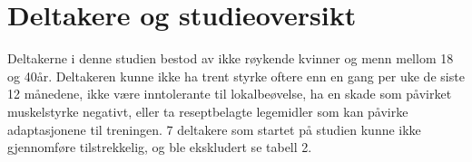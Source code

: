 \documentclass[
]{book}
\begin{document}
\hypertarget{deltakere-og-studieoversikt}{%
\section{Deltakere og studieoversikt}\label{deltakere-og-studieoversikt}}

Deltakerne i denne studien bestod av ikke røykende kvinner og menn mellom 18 og 40år. Deltakeren kunne ikke ha trent styrke oftere enn en gang per uke de siste 12 månedene, ikke være inntolerante til lokalbeøvelse, ha en skade som påvirket muskelstyrke negativt, eller ta reseptbelagte legemidler som kan påvirke adaptasjonene til treningen. 7 deltakere som startet på studien kunne ikke gjennomføre tilstrekkelig, og ble ekskludert se tabell 2.

\providecommand{\docline}[3]{\noalign{\global\setlength{\arrayrulewidth}{#1}}\arrayrulecolor[HTML]{#2}\cline{#3}}

\setlength{\tabcolsep}{2pt}

\renewcommand*{\arraystretch}{1.5}
\end{document}
